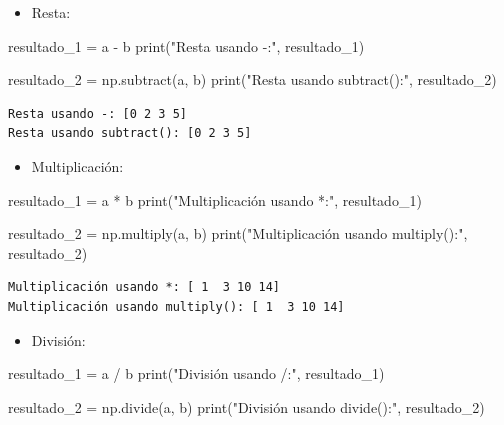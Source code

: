 \documentclass[
  letterpaper,
  DIV=11,
  numbers=noendperiod]{scrreprt}
\newenvironment{Shaded}{\begin{snugshade}}{\end{snugshade}}
\newcommand{\BuiltInTok}[1]{\textcolor[rgb]{0.00,0.23,0.31}{#1}}
\newcommand{\NormalTok}[1]{\textcolor[rgb]{0.00,0.23,0.31}{#1}}
\newcommand{\OperatorTok}[1]{\textcolor[rgb]{0.37,0.37,0.37}{#1}}
\newcommand{\StringTok}[1]{\textcolor[rgb]{0.13,0.47,0.30}{#1}}
\providecommand{\tightlist}{%
  \setlength{\itemsep}{0pt}\setlength{\parskip}{0pt}}\usepackage{longtable,booktabs,array}
\begin{document}
\begin{itemize}
\tightlist
\item
  Resta:
\end{itemize}

\begin{Shaded}
\begin{Highlighting}[]
\NormalTok{resultado\_1 }\OperatorTok{=}\NormalTok{ a }\OperatorTok{{-}}\NormalTok{ b}
\BuiltInTok{print}\NormalTok{(}\StringTok{"Resta usando {-}:"}\NormalTok{, resultado\_1) }

\NormalTok{resultado\_2 }\OperatorTok{=}\NormalTok{ np.subtract(a, b)}
\BuiltInTok{print}\NormalTok{(}\StringTok{"Resta usando subtract():"}\NormalTok{, resultado\_2) }
\end{Highlighting}
\end{Shaded}

\begin{verbatim}
Resta usando -: [0 2 3 5]
Resta usando subtract(): [0 2 3 5]
\end{verbatim}

\begin{itemize}
\tightlist
\item
  Multiplicación:
\end{itemize}

\begin{Shaded}
\begin{Highlighting}[]
\NormalTok{resultado\_1 }\OperatorTok{=}\NormalTok{ a }\OperatorTok{*}\NormalTok{ b}
\BuiltInTok{print}\NormalTok{(}\StringTok{"Multiplicación usando *:"}\NormalTok{, resultado\_1) }

\NormalTok{resultado\_2 }\OperatorTok{=}\NormalTok{ np.multiply(a, b)}
\BuiltInTok{print}\NormalTok{(}\StringTok{"Multiplicación usando multiply():"}\NormalTok{, resultado\_2) }
\end{Highlighting}
\end{Shaded}

\begin{verbatim}
Multiplicación usando *: [ 1  3 10 14]
Multiplicación usando multiply(): [ 1  3 10 14]
\end{verbatim}

\begin{itemize}
\tightlist
\item
  División:
\end{itemize}

\begin{Shaded}
\begin{Highlighting}[]
\NormalTok{resultado\_1 }\OperatorTok{=}\NormalTok{ a }\OperatorTok{/}\NormalTok{ b}
\BuiltInTok{print}\NormalTok{(}\StringTok{"División usando /:"}\NormalTok{, resultado\_1) }

\NormalTok{resultado\_2 }\OperatorTok{=}\NormalTok{ np.divide(a, b)}
\BuiltInTok{print}\NormalTok{(}\StringTok{"División usando divide():"}\NormalTok{, resultado\_2) }
\end{Highlighting}
\end{Shaded}
\end{document}

